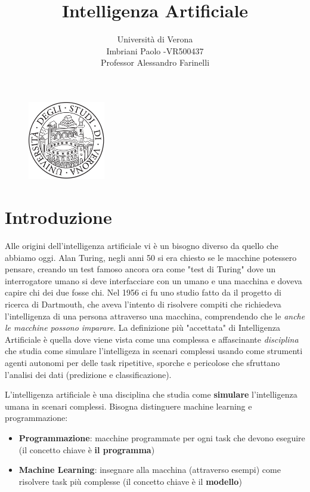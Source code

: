 \documentclass[a4paper]{article}
\title{Intelligenza Artificiale}
\author{Università di Verona\\Imbriani Paolo -VR500437\\Professor Alessandro Farinelli}
\begin{document}
\begin{figure}
    \centering
    \includegraphics[width=0.3\textwidth]{UniversityofVerona.png}
    \label{fig:centered-image}
\end{figure}

\maketitle

\pagebreak

\tableofcontents

\pagebreak

\section{Introduzione}

Alle origini dell'intelligenza artificiale vi è un bisogno diverso da quello che abbiamo oggi.
Alan Turing, negli anni 50 si era chiesto se le macchine potessero pensare, creando un test famoso ancora ora 
come "test di Turing" dove un interrogatore umano si deve interfacciare con un umano e una macchina 
e doveva capire chi dei due fosse chi. 
Nel 1956 ci fu uno studio fatto da il progetto di ricerca di Dartmouth, che aveva l'intento
di risolvere compiti che richiedeva l'intelligenza di una persona attraverso una macchina,
comprendendo che le \textit{anche le macchine possono imparare}.
La definizione più "accettata" di Intelligenza Artificiale è quella dove viene vista come una 
complessa e affascinante \textit{disciplina} che studia come simulare l'intelligeza in scenari complessi usando come
strumenti agenti autonomi per delle task ripetitive, sporche e pericolose che sfruttano l'analisi dei dati
(predizione e classificazione).

\dfn{}
{
    L'intelligenza artificiale è una disciplina che studia come \textbf{simulare} l'intelligenza
    umana in scenari complessi.
}
\noindent
Bisogna distinguere machine learning e programmazione:
\begin{itemize}
    \item \textbf{Programmazione}: macchine programmate per ogni task che devono eseguire (il concetto chiave
    è \textbf{il programma})
    \item \textbf{Machine Learning}: insegnare alla macchina (attraverso esempi) come risolvere task più complesse (il concetto chiave 
    è il \textbf{modello})
\end{itemize}
\end{document}
